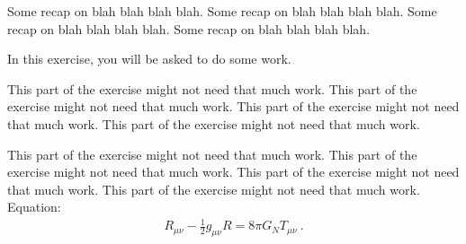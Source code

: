 \documentclass[11pt,a4paper]{article}
\begin{document}
\MakeUebungHeader


\begin{tips}
Some recap on blah blah blah blah.
Some recap on blah blah blah blah.
Some recap on blah blah blah blah.
Some recap on blah blah blah blah.
\end{tips}



In this exercise, you will be asked to do some work.

\begin{tips}
This part of the exercise might not need that much work.
This part of the exercise might not need that much work.
This part of the exercise might not need that much work.
This part of the exercise might not need that much work.
\end{tips}


\begin{onlytipssheet}
This part of the exercise might not need that much work.
This part of the exercise might not need that much work.
This part of the exercise might not need that much work.
This part of the exercise might not need that much work. Equation:
\begin{align}
  R_{\mu\nu}-\frac12g_{\mu\nu}R =8\pi G_N T_{\mu\nu}\ .
\end{align}
\end{onlytipssheet}
\end{document}
